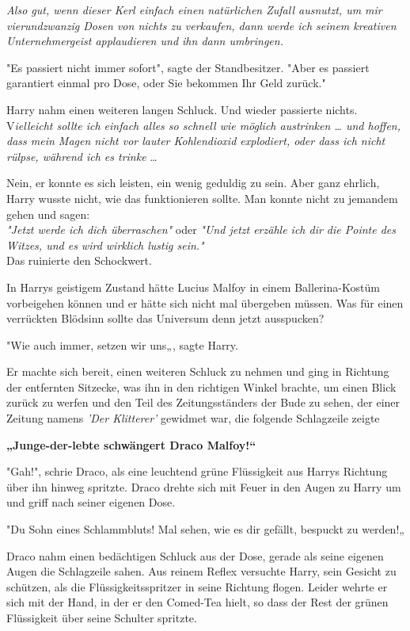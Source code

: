 {\emph{Also gut, wenn dieser Kerl einfach einen natürlichen Zufall ausnutzt, um mir vierundzwanzig Dosen von nichts zu verkaufen, dann werde ich seinem kreativen Unternehmergeist applaudieren und ihn dann umbringen.}

"Es passiert nicht immer sofort", sagte der Standbesitzer. "Aber es passiert garantiert einmal pro Dose, oder Sie bekommen Ihr Geld zurück."

Harry nahm einen weiteren langen Schluck. Und wieder passierte nichts. V\emph{ielleicht sollte ich einfach alles so schnell wie möglich austrinken … und hoffen, dass mein Magen nicht vor lauter Kohlendioxid explodiert, oder dass ich nicht rülpse, während ich es trinke} …

Nein, er konnte es sich leisten, ein wenig geduldig zu sein. Aber ganz ehrlich, Harry wusste nicht, wie das funktionieren sollte. Man konnte nicht zu jemandem gehen und sagen:\\ \emph{"Jetzt werde ich dich überraschen"} oder \emph{"Und jetzt erzähle ich dir die Pointe des Witzes, und es wird wirklich lustig sein."}\\ Das ruinierte den Schockwert.

In Harrys geistigem Zustand hätte Lucius Malfoy in einem Ballerina-Kostüm vorbeigehen können und er hätte sich nicht mal übergeben müssen. Was für einen verrückten Blödsinn sollte das Universum denn jetzt ausspucken?

"Wie auch immer, setzen wir uns„, sagte Harry.

Er machte sich bereit, einen weiteren Schluck zu nehmen und ging in Richtung der entfernten Sitzecke, was ihn in den richtigen Winkel brachte, um einen Blick zurück zu werfen und den Teil des Zeitungsständers der Bude zu sehen, der einer Zeitung namens \emph{'Der Klitterer'} gewidmet war, die folgende Schlagzeile zeigte

\textbf{„Junge-der-lebte schwängert Draco Malfoy!“}

"Gah!", schrie Draco, als eine leuchtend grüne Flüssigkeit aus Harrys Richtung über ihn hinweg spritzte. Draco drehte sich mit Feuer in den Augen zu Harry um und griff nach seiner eigenen Dose.

"Du Sohn eines Schlammbluts! Mal sehen, wie es dir gefällt, bespuckt zu werden!„

Draco nahm einen bedächtigen Schluck aus der Dose, gerade als seine eigenen Augen die Schlagzeile sahen. Aus reinem Reflex versuchte Harry, sein Gesicht zu schützen, als die Flüssigkeitsspritzer in seine Richtung flogen. Leider wehrte er sich mit der Hand, in der er den Comed-Tea hielt, so dass der Rest der grünen Flüssigkeit über seine Schulter spritzte.

}
